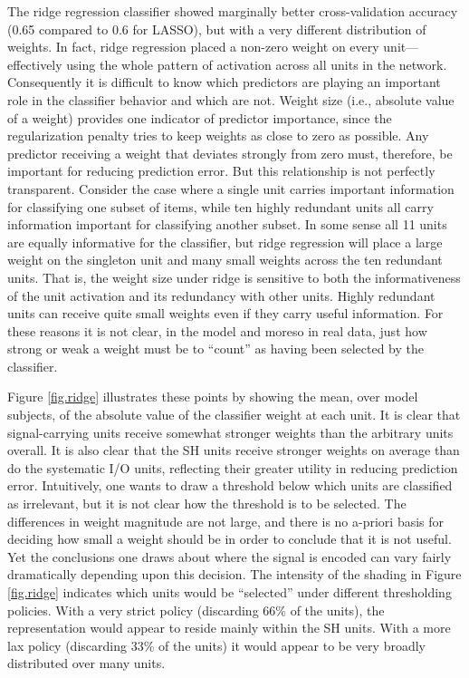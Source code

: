 The ridge regression classifier showed marginally better cross-validation accuracy (0.65 compared to 0.6 for LASSO), but with a very different distribution of weights. In fact, ridge regression placed a non-zero weight on every unit---effectively using the whole pattern of activation across all units in the network. Consequently it is difficult to know which predictors are playing an important role in the classifier behavior and which are not. Weight size (i.e., absolute value of a weight) provides one indicator of predictor importance, since the regularization penalty tries to keep weights as close to zero as possible. Any predictor receiving a weight that deviates strongly from zero must, therefore, be important for reducing prediction error. But this relationship is not perfectly transparent. Consider the case where a single unit carries important information for classifying one subset of items, while ten highly redundant units all carry information important for classifying another subset. In some sense all 11 units are equally informative for the classifier, but ridge regression will place a large weight on the singleton unit and many small weights across the ten redundant units. That is, the weight size under ridge is sensitive to both the informativeness of the unit activation and its redundancy with other units. Highly redundant units can receive quite small weights even if they carry useful information. For these reasons it is not clear, in the model and moreso in real data, just how strong or weak a weight must be to ``count'' as having been selected by the classifier. 

Figure \ref{fig.ridge} illustrates these points by showing the mean, over model subjects, of the absolute value of the classifier weight at each unit. It is clear that signal-carrying units receive somewhat stronger weights than the arbitrary units overall. It is also clear that the SH units receive stronger weights on average than do the systematic I/O units, reflecting their greater utility in reducing prediction error. Intuitively, one wants to draw a threshold below which units are classified as irrelevant, but it is not clear how the threshold is to be selected. The differences in weight magnitude are not large, and there is no a-priori basis for deciding how small a weight should be in order to conclude that it is not useful. Yet the conclusions one draws about where the signal is encoded can vary fairly dramatically depending upon this decision. The intensity of the shading in Figure \ref{fig.ridge} indicates which units would be ``selected'' under different thresholding policies. With a very strict policy (discarding 66\% of the units), the representation would appear to reside mainly within the SH units. With a more lax policy (discarding 33\% of the units) it would appear to be very broadly distributed over many units.

